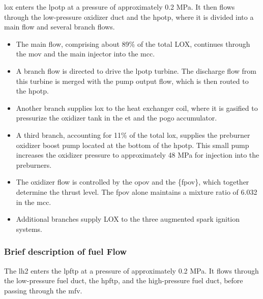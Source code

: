 \acrlong{lox} enters the \acrfull{lpotp} at a pressure of approximately 0.2 MPa. It then flows through the low-pressure oxidizer duct and the \acrfull{hpotp}, where it is divided into a main flow and several branch flows. 
\begin{itemize}
    \item The main flow, comprising about 89\% of the total LOX, continues through the \acrfull{mov} and the main injector into the \acrfull{mcc}.
    \item A branch flow is directed to drive the \acrshort{lpotp} turbine. The discharge flow from this turbine is merged with the pump output flow, which is then routed to the \acrshort{hpotp}.
    \item Another branch supplies \acrshort{lox} to the heat exchanger coil, where it is gasified to pressurize the oxidizer tank in the \acrlong{et} and the pogo accumulator.
    \item A third branch, accounting for 11\% of the total \acrshort{lox}, supplies the preburner oxidizer boost pump located at the bottom of the \acrshort{hpotp}. This small pump increases the oxidizer pressure to approximately 48 MPa for injection into the preburners.
        
    \item The oxidizer flow is controlled by the \acrfull{opov} and the \acrfull{{fpov}}, which together determine the thrust level. The \acrshort{fpov} alone maintains a mixture ratio of 6.032 in the \acrshort{mcc}.
    \item Additional branches supply LOX to the three augmented spark ignition systems.
\end{itemize}

\subsubsection{Brief description of fuel Flow}
The \acrfull{lh2} enters the \acrfull{lpftp} at a pressure of approximately 0.2 MPa. It flows through the low-pressure fuel duct, the \acrfull{hpftp}, and the high-pressure fuel duct, before passing through the \acrfull{mfv}. 

